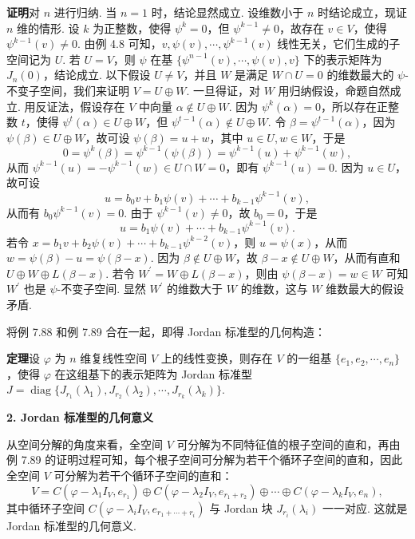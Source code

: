 \documentclass[UTF8,12pt,a4paper,fontset=fandol]{ctexart}
\begin{document}
\noindent\textbf{证明}\quad 对 $n$ 进行归纳. 当 $n=1$ 时，结论显然成立. 设维数小于 $n$ 时结论成立，现证 $n$ 维的情形. 设 $k$ 为正整数，使得 $\psi^k=0$，但 $\psi^{k-1}\ne0$，故存在 $v\in V$，使得 $\psi^{k-1}(v)\ne0$. 由例 4.8 可知，$v,\psi(v),\cdots,\psi^{k-1}(v)$ 线性无关，它们生成的子空间记为 $U$. 若 $U=V$，则 $\psi$ 在基 $\{\psi^{n-1}(v),\cdots,\psi(v),v\}$ 下的表示矩阵为 $J_n(0)$，结论成立. 以下假设 $U\ne V$，并且 $W$ 是满足 $W\cap U=0$ 的维数最大的 $\psi$-不变子空间，我们来证明 $V=U\oplus W$. 一旦得证，对 $W$ 用归纳假设，命题自然成立. 用反证法，假设存在 $V$ 中向量 $\alpha\notin U\oplus W$. 因为 $\psi^k(\alpha)=0$，所以存在正整数 $t$，使得 $\psi^t(\alpha)\in U\oplus W$，但 $\psi^{t-1}(\alpha)\notin U\oplus W$. 令 $\beta=\psi^{t-1}(\alpha)$，因为 $\psi(\beta)\in U\oplus W$，故可设 $\psi(\beta)=u+w$，其中 $u\in U,w\in W$，于是
\[
0=\psi^k(\beta)=\psi^{k-1}(\psi(\beta))=\psi^{k-1}(u)+\psi^{k-1}(w),
\]
从而 $\psi^{k-1}(u)=-\psi^{k-1}(w)\in U\cap W=0$，即有 $\psi^{k-1}(u)=0$. 因为 $u\in U$，故可设
\[
u=b_0v+b_1\psi(v)+\cdots+b_{k-1}\psi^{k-1}(v),
\]
从而有 $b_0\psi^{k-1}(v)=0$. 由于 $\psi^{k-1}(v)\ne0$，故 $b_0=0$，于是
\[
u=b_1\psi(v)+\cdots+b_{k-1}\psi^{k-1}(v).
\]
若令 $x=b_1v+b_2\psi(v)+\cdots+b_{k-1}\psi^{k-2}(v)$，则 $u=\psi(x)$，从而 $w=\psi(\beta)-u=\psi(\beta-x)$. 因为 $\beta\notin U\oplus W$，故 $\beta-x\notin U\oplus W$，从而有直和 $U\oplus W\oplus L(\beta-x)$. 若令 $W^{\prime}=W\oplus L(\beta-x)$，则由 $\psi(\beta-x)=w\in W$ 可知 $W^{\prime}$ 也是 $\psi$-不变子空间. 显然 $W^{\prime}$ 的维数大于 $W$ 的维数，这与 $W$ 维数最大的假设矛盾.

将例 7.88 和例 7.89 合在一起，即得 Jordan 标准型的几何构造：

\noindent\textbf{定理}\quad 设 $\varphi$ 为 $n$ 维复线性空间 $V$ 上的线性变换，则存在 $V$ 的一组基 $\{e_1,e_2,\cdots,e_n\}$，使得 $\varphi$ 在这组基下的表示矩阵为 Jordan 标准型 $J=\operatorname{diag}\{J_{r_1}(\lambda_1),J_{r_2}(\lambda_2),\cdots,J_{r_k}(\lambda_k)\}$.

\noindent\textbf{2. Jordan 标准型的几何意义}

从空间分解的角度来看，全空间 $V$ 可分解为不同特征值的根子空间的直和，再由例 7.89 的证明过程可知，每个根子空间可分解为若干个循环子空间的直和，因此全空间 $V$ 可分解为若干个循环子空间的直和：
\begin{equation}
V=C(\varphi-\lambda_1I_V,e_{r_1})\oplus C(\varphi-\lambda_2I_V,e_{r_1+r_2})\oplus\cdots\oplus C(\varphi-\lambda_kI_V,e_n),
\tag{7.17}
\end{equation}
其中循环子空间 $C(\varphi-\lambda_iI_V,e_{r_1+\cdots+r_i})$ 与 Jordan 块 $J_{r_i}(\lambda_i)$ 一一对应. 这就是 Jordan 标准型的几何意义.
\end{document}
